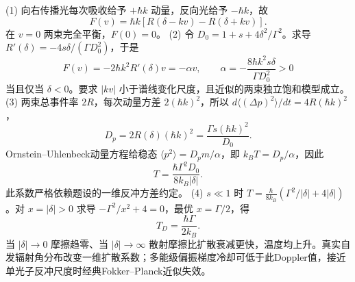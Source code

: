 (1) 向右传播光每次吸收给予 \(+\hbar k\) 动量，反向光给予 \(-\hbar k\)，故
\[
F(v)=\hbar k[R(\delta-kv)-R(\delta+kv)].
\]
在 \(v=0\) 两束完全平衡，\(F(0)=0\)。
(2) 令 \(D_0=1+s+4\delta^2/\Gamma^2\)。求导 \(R'(\delta)=-4s\delta/(\Gamma D_0^2)\)，于是
\[
F(v)=-2\hbar k^2R'(\delta)v=-\alpha v,\qquad
\alpha=-\frac{8\hbar k^2s\delta}{\Gamma D_0^2}>0
\]
当且仅当 \(\delta<0\)。要求 \(|kv|\) 小于谱线变化尺度，且近似的两束独立饱和模型成立。
(3) 两束总事件率 \(2R\)，每次动量方差 \(2(\hbar k)^2\)，所以 \(d\langle(\Delta p)^2\rangle/dt=4R(\hbar k)^2\)，
\[
D_p=2R(\delta)(\hbar k)^2=\frac{\Gamma s(\hbar k)^2}{D_0}.
\]
Ornstein--Uhlenbeck动量方程给稳态 \(\langle p^2\rangle=D_pm/\alpha\)，即 \(k_BT=D_p/\alpha\)，因此
\[
T=\frac{\hbar\Gamma^2D_0}{8k_B|\delta|}.
\]
此系数严格依赖题设的一维反冲方差约定。
(4) \(s\ll1\) 时 \(T=\frac{\hbar}{8k_B}(\Gamma^2/|\delta|+4|\delta|)\)。对 \(x=|\delta|>0\) 求导 \(-\Gamma^2/x^2+4=0\)，最优 \(x=\Gamma/2\)，得
\[
T_D=\frac{\hbar\Gamma}{2k_B}.
\]
当 \(|\delta|\to0\) 摩擦趋零、当 \(|\delta|\to\infty\) 散射摩擦比扩散衰减更快，温度均上升。真实自发辐射角分布改变一维扩散系数；多能级偏振梯度冷却可低于此Doppler值，接近单光子反冲尺度时经典Fokker–Planck近似失效。
